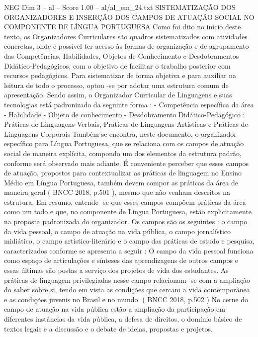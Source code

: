 \begin{textsample}{NEG Dim 3 – al – Score 1.00 – al/al\_em\_24.txt}  \label{ex:f3_neg_077}
SISTEMATIZAÇÃO DOS ORGANIZADORES E INSERÇÃO DOS CAMPOS DE ATUAÇÃO SOCIAL NO COMPONENTE DE LÍNGUA PORTUGUESA Como foi dito no início deste texto, os Organizadores Curriculares são quadros sistematizados com atividades concretas, onde é possível ter acesso às formas de organização e de agrupamento das Competências, Habilidades, Objetos de Conhecimento e Desdobramentos Didático-Pedagógicos, com o objetivo de facilitar o trabalho posterior com recursos pedagógicos.
Para sistematizar de forma objetiva e para auxiliar na leitura de todo o processo, optou -se por adotar uma estrutura comum de apresentação.
Sendo assim, o Organizador Curricular de Linguagens e suas tecnologias está padronizado da seguinte forma : - Competência específica da área - Habilidade - Objeto de conhecimento - Desdobramento Didático-Pedagógico : Práticas de Linguagens Verbais, Práticas de Linguagens Artísticas e Práticas de Linguagens Corporais Também se encontra, neste documento, o organizador específico para Língua Portuguesa, que se relaciona com os campos de atuação social de maneira explícita, compondo um dos elementos da estrutura padrão, conforme será observado mais adiante.
É conveniente perceber que esses campos de atuação, propostos para contextualizar as práticas de linguagem no Ensino Médio em Língua Portuguesa, também devem compor as práticas da área de maneira geral ( BNCC 2018, p.501 ), mesmo que não venham descritos na estrutura.
Em resumo, entende -se que esses campos compõem práticas da área como um todo e que, no componente de Língua Portuguesa, estão explicitamente na proposta padronizada do organizador.
Os campos são os seguintes : o campo da vida pessoal, o campo de atuação na vida pública, o campo jornalístico midiático, o campo artístico-literário e o campo das práticas de estudo e pesquisa, caracterizados conforme se apresenta a seguir : O campo da vida pessoal funciona como espaço de articulações e sínteses das aprendizagens de outros campos e essas últimas são postas a serviço dos projetos de vida dos estudantes.
As práticas de linguagem privilegiadas nesse campo relacionam -se com a ampliação do saber sobre si, tendo em vista as condições que cercam a vida contemporânea e as condições juvenis no Brasil e no mundo. ( BNCC 2018, p.502 ) No cerne do campo de atuação na vida pública estão a ampliação da participação em diferentes instâncias da vida pública, a defesa de direitos, o domínio básico de textos legais e a discussão e o debate de ideias, propostas e projetos.

\end{textsample}
